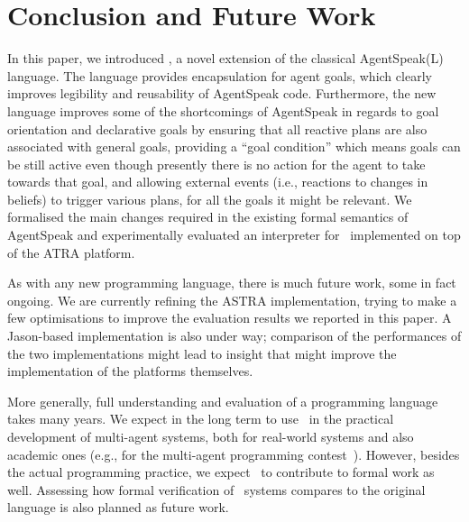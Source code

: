 \section{Conclusion and Future Work}
\label{sec:conclusion}

In this paper, we introduced \aser, a novel extension of the classical
AgentSpeak(L) language. The language provides encapsulation for agent
goals, which clearly improves legibility and reusability of AgentSpeak
code. Furthermore, the new language improves some of the shortcomings
of AgentSpeak in regards to goal orientation and declarative goals by
ensuring that all reactive plans are also associated with general
goals, providing a ``goal condition'' which means goals can be still
active even though presently there is no action for the agent to take
towards that goal, and allowing external events (i.e., reactions to
changes in beliefs) to trigger various plans, for all the goals it
might be relevant.  We formalised the main changes required in the
existing formal semantics of AgentSpeak and experimentally evaluated
an interpreter for \aser\ implemented on top of the ATRA platform.

As with any new programming language, there is much future work, some
in fact ongoing. We are currently refining the ASTRA implementation,
trying to make a few optimisations to improve the evaluation results we
reported in this paper. A Jason-based implementation is also under
way; comparison of the performances of the two implementations might
lead to insight that might improve the implementation of the platforms
themselves. 

More generally, full understanding and evaluation of a programming
language takes many years. We expect in the long term to use \aser\ in
the practical development of multi-agent systems, both for real-world
systems and also academic ones (e.g., for the multi-agent
programming contest~\cite{??}). However, besides the actual
programming practice, we expect \aser\ to contribute to formal work as
well. Assessing how formal verification of \aser\ systems compares to
the original language is also planned as future work.


